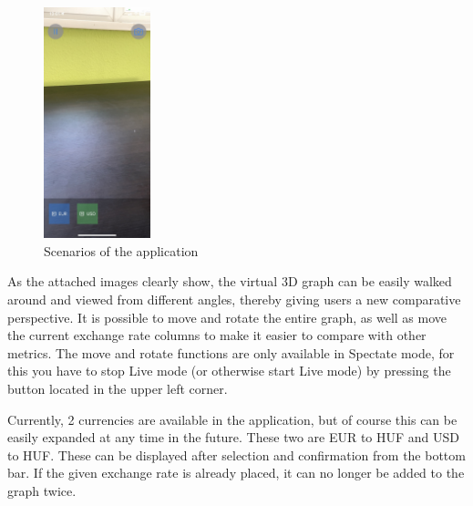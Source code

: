 \begin{figure}[!ht]
    \includegraphics[height=67mm, keepaspectratio]{../images/selector.jpeg}
    \caption{Scenarios of the application}
    \label{fig:HVSpaces}
\end{figure}


As the attached images clearly show, the virtual 3D graph can be easily walked around and viewed from different angles, thereby giving users a new comparative perspective. It is possible to move and rotate the entire graph, as well as move the current exchange rate columns to make it easier to compare with other metrics. The move and rotate functions are only available in Spectate mode, for this you have to stop Live mode (or otherwise start Live mode) by pressing the button located in the upper left corner.

Currently, 2 currencies are available in the application, but of course this can be easily expanded at any time in the future. These two are EUR to HUF and USD to HUF. These can be displayed after selection and confirmation from the bottom bar. If the given exchange rate is already placed, it can no longer be added to the graph twice.



